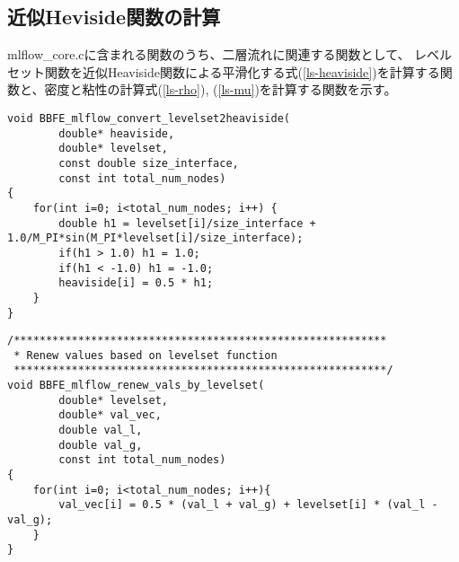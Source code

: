 \subsection{近似Heviside関数の計算}
mlflow\_core.cに含まれる関数のうち、二層流れに関連する関数として、
レベルセット関数を近似Heaviside関数による平滑化する式(\ref{ls-heaviside})を計算する関数と、密度と粘性の計算式(\ref{ls-rho}), (\ref{ls-mu})を計算する関数を示す。

\begin{lstlisting}[caption = mlflow\_impfunc.cのレベルセット関数の近似Heaviside関数による平滑化計算]
void BBFE_mlflow_convert_levelset2heaviside(
		double* heaviside,
		double* levelset,
		const double size_interface,
		const int total_num_nodes)
{
	for(int i=0; i<total_num_nodes; i++) {
		double h1 = levelset[i]/size_interface + 1.0/M_PI*sin(M_PI*levelset[i]/size_interface);
		if(h1 > 1.0) h1 = 1.0;
		if(h1 < -1.0) h1 = -1.0;
		heaviside[i] = 0.5 * h1;
	}
}
\end{lstlisting}

\begin{lstlisting}[caption = mlflow\_impfunc.cの密度と粘性の計算]
/**********************************************************
 * Renew values based on levelset function
 **********************************************************/
void BBFE_mlflow_renew_vals_by_levelset(
		double* levelset,
		double* val_vec,
		double val_l,
		double val_g,
		const int total_num_nodes)
{
	for(int i=0; i<total_num_nodes; i++){
		val_vec[i] = 0.5 * (val_l + val_g) + levelset[i] * (val_l - val_g);
	}
}
\end{lstlisting}

